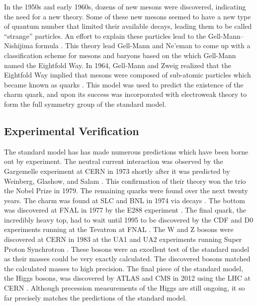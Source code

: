In the 1950s and early 1960s, dozens of new mesons were discovered, indicating
the need for a new theory. Some of these new mesons seemed to have a new type
of quantum number that limited their available decays, leading them to be
called ``strange'' particles. An effort to explain these particles lead to the
Gell-Mann--Nishijima formula
\cite{nakano1953}\cite{nishijima1955}\cite{gellmann1956}. This theory lead
Gell-Mann and Ne'eman to come up with a classification scheme for mesons and
baryons based on the \SUthree which Gell-Mann named the Eightfold Way. In 1964,
Gell-Mann and Zweig realized that the Eightfold Way implied that mesons were
composed of sub-atomic particles which became known as quarks
\cite{gellmann1964}\cite{zweig1964}. This model was used to predict the
existence of the charm quark, and upon its success was incorporated with
electroweak theory to form the full \SUthreeSUtwoUone symmetry group of the
standard model.

\subsection{Experimental Verification}

The standard model has has made numerous predictions which have been borne out
by experiment. The neutral current interaction was observed by the Gargemelle
experiment at CERN in 1973 shortly after it was predicted by Weinberg, Glashow,
and Salam \cite{hasert1973}. This confirmation of their theory won the trio the
Nobel Prize in 1979. The remaining quarks were found over the next twenty
years. The charm was found at SLC and BNL in 1974 via \jpsi decays
\cite{aubert1974}\cite{augustin1974}. The bottom was discovered at FNAL in 1977
by the E288 experiment \cite{herb1977}. The final quark, the incredibly heavy
top, had to wait until 1995 to be discovered by the CDF and D0 experiments
running at the Tevatron at FNAL \cite{cdf1995}\cite{d01995}. The W and Z bosons
were discovered at CERN in 1983 at the UA1 and UA2 experiments running Super
Proton Synchrotron \cite{ua1_w}\cite{ua2_w}\cite{ua1_z}\cite{ua2_z}. These
bosons were an excellent test of the standard model as their masses could be
very exactly calculated. The discovered bosons matched the calculated masses to
high precision. The final piece of the standard model, the Higgs bosons, was
discovered by ATLAS and CMS in 2012 using the LHC at CERN
\cite{atlas_higgs}\cite{cms_higgs}. Although precession measurements of the
Higgs are still ongoing, it so far precisely matches the predictions of the
standard model.
